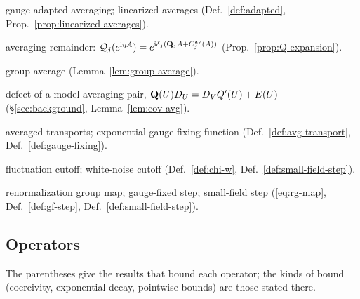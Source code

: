{\begin{description}[font=\normalfont,style=nextline,leftmargin=10em,labelwidth=9.5em,labelsep=0.5em,itemsep=1pt,parsep=0pt,topsep=4pt]
\item[$\mathcal Q$, $\bQ_k$, $Q'_k$] gauge-adapted averaging; linearized averages (Def.~\ref{def:adapted}, Prop.~\ref{prop:linearized-averages}).
\item[$\Cav_j$] averaging remainder: $\mathcal Q_j(e^{\mathrm i\eta A})=e^{\mathrm i\delta_j(\mathbf Q_jA+C^{\rm av}_j(A))}$ (Prop.~\ref{prop:Q-expansion}).
\item[$\Av(\mathbf U)$] group average (Lemma~\ref{lem:group-average}).
\item[$E(U)$] defect of a model averaging pair, $\mathbf Q(U)D_U=D_VQ'(U)+E(U)$ (\S\ref{sec:background}, Lemma~\ref{lem:cov-avg}).
\item[$\mathfrak G_W$, $\mathrm{gf}_W$] averaged transports; exponential gauge-fixing function (Def.~\ref{def:avg-transport}, Def.~\ref{def:gauge-fixing}).
\item[$\chi^{\rm w}$, $\chi_\xi$] fluctuation cutoff; white-noise cutoff (Def.~\ref{def:chi-w}, Def.~\ref{def:small-field-step}).
\item[$T$, $T^{\rm gf}$, $T_{\rm sf}$] renormalization group map; gauge-fixed step; small-field step (\eqref{eq:rg-map}, Def.~\ref{def:gf-step}, Def.~\ref{def:small-field-step}).
\end{description}}

\subsection*{Operators}

The parentheses give the results that bound each operator; the kinds of bound (coercivity, exponential decay, pointwise bounds) are those stated there.

